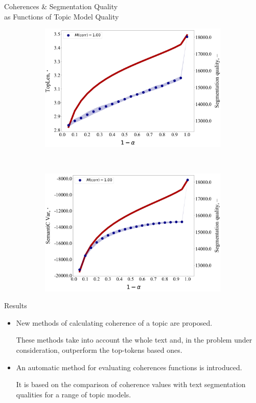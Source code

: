 \documentclass[russian]{beamer}
\begin{document}
\begin{frame}{Coherences \& Segmentation Quality\\as Functions of Topic Model Quality}
\begin{figure}[h]
\begin{subfigure}[t]{0.48\textwidth}
      \includegraphics[width=\linewidth]{toplen-iteration.jpg}
    \end{subfigure}
    ~
    \begin{subfigure}[t]{0.48\textwidth}
      \includegraphics[width=\linewidth]{semantic_var-iteration.jpg}
    \end{subfigure}
  \end{figure}
\end{frame}


\begin{frame}{Results}
  \begin{itemize}
  \setlength\itemsep{0.5cm}
  \item
    New methods of calculating coherence of a topic are proposed.
    
    \smallskip
    
    These methods take into account the whole text and, in the problem under consideration, outperform the top-tokens based ones.
  \item
    An automatic method for evaluating coherences functions is introduced.
    
    \smallskip
    
    It is based on the comparison of coherence values with text segmentation qualities for a range of topic models.
  \end{itemize}
\end{frame}
\end{document}
